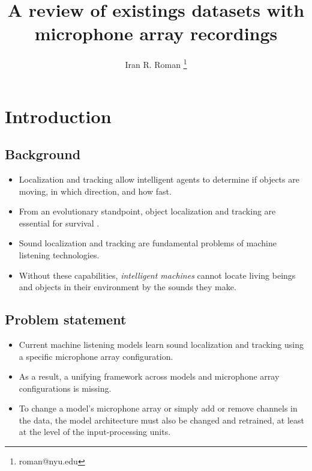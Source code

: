 \documentclass[14pt, legalpaper]{extarticle}
\title{A review of existings datasets with microphone array recordings}
\author{Iran R. Roman \thanks{roman@nyu.edu}}
\affil{Music and Audio Research Laboratory, New York University}
\date{}
\begin{document}
\maketitle
\tableofcontents

\vspace{.25in}

\section{Introduction}

\subsection{Background}

\begin{itemize}

\item Localization and tracking allow intelligent agents to determine if objects are moving, in which direction, and how fast. 

\item From an evolutionary standpoint, object localization and tracking are essential for survival \cite{heffner2018evolution}.

\item Sound localization and tracking are fundamental problems of machine listening technologies.

\item Without these capabilities, {\it intelligent machines} cannot locate living beings and objects in their environment by the sounds they make. 

\end{itemize}

\subsection{Problem statement}

\begin{itemize}

\item Current machine listening models learn sound localization and tracking using a specific microphone array configuration. 

\item As a result, a unifying framework across models and microphone array configurations is  missing. 

\item To change a model's microphone array or simply add or remove channels in the data, the model architecture must also be changed and retrained, at least at the level of the input-processing units.

\end{itemize}
\end{document}
